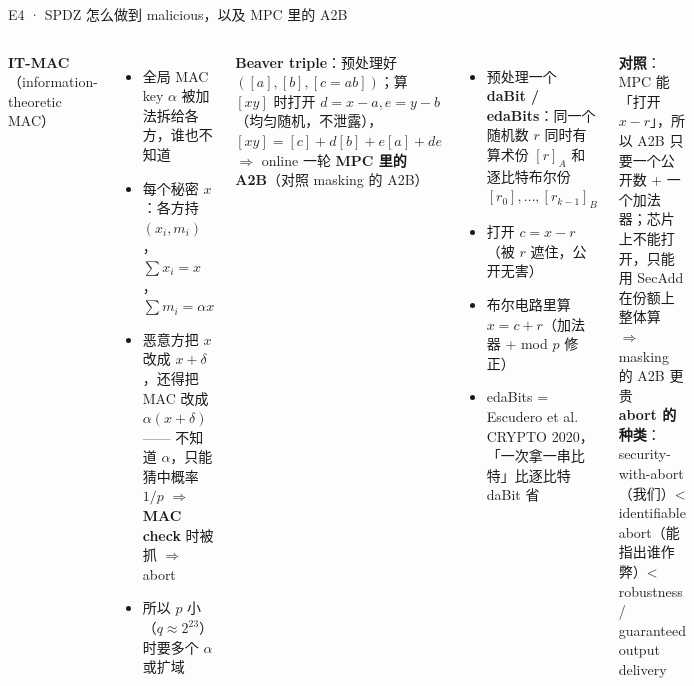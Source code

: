 \documentclass[aspectratio=169,10pt,fontset=none]{ctexbeamer}
\begin{document}
\begin{frame}{E4 · SPDZ 怎么做到 malicious，以及 MPC 里的 A2B}
\begin{columns}[T]
\textbf{IT-MAC}（information-theoretic MAC）
\begin{itemize}
  \item 全局 MAC key $\alpha$ 被加法拆给各方，谁也不知道
  \item 每个秘密 $x$：各方持 $(x_i,m_i)$，$\sum x_i=x$，$\sum m_i=\alpha x$
  \item 恶意方把 $x$ 改成 $x+\delta$，还得把 MAC 改成 $\alpha(x+\delta)$ —— 不知道 $\alpha$，只能猜中概率 $1/p$ $\Rightarrow$ \textbf{MAC check} 时被抓 $\Rightarrow$ abort
  \item 所以 $p$ 小（$q\approx2^{23}$）时要多个 $\alpha$ 或扩域
\end{itemize}
\textbf{Beaver triple}：预处理好 $([a],[b],[c=ab])$；算 $[xy]$ 时打开 $d=x-a,e=y-b$（均匀随机，不泄露），$[xy]=[c]+d[b]+e[a]+de$ $\Rightarrow$ online 一轮
\textbf{MPC 里的 A2B}（对照 masking 的 A2B）
\begin{itemize}
  \item 预处理一个 \textbf{daBit / edaBits}：同一个随机数 $r$ 同时有算术份 $[r]_A$ 和逐比特布尔份 $[r_0],\dots,[r_{k-1}]_B$
  \item 打开 $c=x-r$（被 $r$ 遮住，公开无害）
  \item 布尔电路里算 $x=c+r$（加法器 + mod $p$ 修正）
  \item edaBits = Escudero et al. CRYPTO 2020，「一次拿一串比特」比逐比特 daBit 省
\end{itemize}
\textbf{对照}：MPC 能「打开 $x-r$」，所以 A2B 只要一个公开数 + 一个加法器；芯片上不能打开，只能用 SecAdd 在份额上整体算 $\Rightarrow$ masking 的 A2B 更贵\\[3pt]
\textbf{abort 的种类}：security-with-abort（我们）< identifiable abort（能指出谁作弊）< robustness / guaranteed output delivery
\end{columns}
\end{frame}
\end{document}
